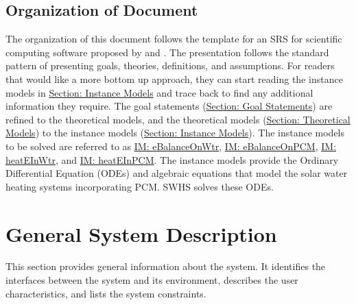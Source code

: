 \documentclass[12pt]{article}
\begin{document}
\subsection{Organization of Document}
\label{Sec:DocOrg}
The organization of this document follows the template for an SRS for scientific computing software proposed by \cite{dParnas1972} and \cite{parnasClements1984}. The presentation follows the standard pattern of presenting goals, theories, definitions, and assumptions. For readers that would like a more bottom up approach, they can start reading the instance models in \hyperref[Sec:IMs]{Section: Instance Models} and trace back to find any additional information they require.
The goal statements (\hyperref[Sec:GoalStmt]{Section: Goal Statements}) are refined to the theoretical models, and the theoretical models (\hyperref[Sec:TMs]{Section: Theoretical Models}) to the instance models (\hyperref[Sec:IMs]{Section: Instance Models}). The instance models to be solved are referred to as \hyperref[IM:eBalanceOnWtr]{IM: eBalanceOnWtr}, \hyperref[IM:eBalanceOnPCM]{IM: eBalanceOnPCM}, \hyperref[IM:heatEInWtr]{IM: heatEInWtr}, and \hyperref[IM:heatEInPCM]{IM: heatEInPCM}. The instance models provide the Ordinary Differential Equation (ODEs) and algebraic equations that model the solar water heating systems incorporating PCM. SWHS solves these ODEs.
\section{General System Description}
\label{Sec:GenSysDesc}
This section provides general information about the system. It identifies the interfaces between the system and its environment, describes the user characteristics, and lists the system constraints.
\end{document}
